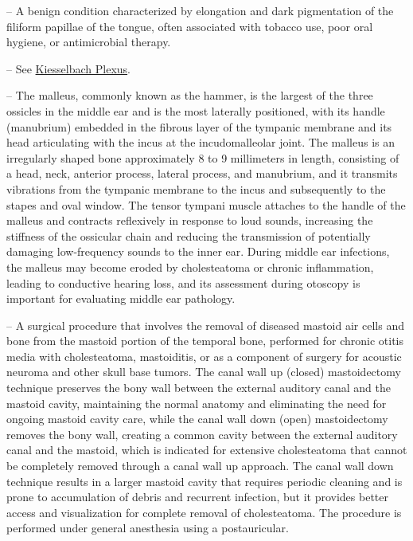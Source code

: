 -- A benign condition characterized by elongation and dark pigmentation of the filiform papillae of the tongue, often associated with tobacco use, poor oral hygiene, or antimicrobial therapy.

-- See \hyperlink{Kiesselbach Plexus}{Kiesselbach Plexus}.

-- The malleus, commonly known as the hammer, is the largest of the three ossicles in the middle ear and is the most laterally positioned, with its handle (manubrium) embedded in the fibrous layer of the tympanic membrane and its head articulating with the incus at the incudomalleolar joint. The malleus is an irregularly shaped bone approximately 8 to 9 millimeters in length, consisting of a head, neck, anterior process, lateral process, and manubrium, and it transmits vibrations from the tympanic membrane to the incus and subsequently to the stapes and oval window. The tensor tympani muscle attaches to the handle of the malleus and contracts reflexively in response to loud sounds, increasing the stiffness of the ossicular chain and reducing the transmission of potentially damaging low-frequency sounds to the inner ear. During middle ear infections, the malleus may become eroded by cholesteatoma or chronic inflammation, leading to conductive hearing loss, and its assessment during otoscopy is important for evaluating middle ear pathology.

-- A surgical procedure that involves the removal of diseased mastoid air cells and bone from the mastoid portion of the temporal bone, performed for chronic otitis media with cholesteatoma, mastoiditis, or as a component of surgery for acoustic neuroma and other skull base tumors. The canal wall up (closed) mastoidectomy technique preserves the bony wall between the external auditory canal and the mastoid cavity, maintaining the normal anatomy and eliminating the need for ongoing mastoid cavity care, while the canal wall down (open) mastoidectomy removes the bony wall, creating a common cavity between the external auditory canal and the mastoid, which is indicated for extensive cholesteatoma that cannot be completely removed through a canal wall up approach. The canal wall down technique results in a larger mastoid cavity that requires periodic cleaning and is prone to accumulation of debris and recurrent infection, but it provides better access and visualization for complete removal of cholesteatoma. The procedure is performed under general anesthesia using a postauricular.

